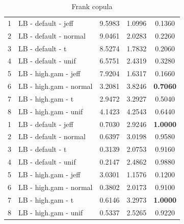 \documentclass{amsart}
\begin{document}
\begin{table}[ht]
\begin{tabular}{l|l|ccc}
   \midrule
1 & LB - default - jeff & 9.5983 & 1.0996 & 0.1360 \\ 
  2 & LB - default - normal & 9.0461 & 2.0283 & 0.2260 \\ 
  3 & LB - default - t & 8.5274 & 1.7832 & 0.2060 \\ 
  4 & LB - default - unif & 6.5751 & 2.4319 & 0.3280 \\ 
  5 & LB - high.gam - jeff & 7.9204 & 1.6317 & 0.1660 \\ 
  6 & LB - high.gam - normal & 3.2081 & 3.8246 & \textbf{0.7060} \\ 
  7 & LB - high.gam - t & 2.9472 & 3.2927 & 0.5040 \\ 
  8 & LB - high.gam - unif & 4.1423 & 4.2543 & 0.6440 \\
   \midrule
1 & LB - default - jeff & 0.7030 & 2.9246 & \textbf{1.0000} \\ 
  2 & LB - default - normal & 0.6397 & 3.0198 & 0.9580 \\ 
  3 & LB - default - t & 0.3139 & 2.0753 & 0.9160 \\ 
  4 & LB - default - unif & 0.2147 & 2.4862 & 0.9880 \\ 
  5 & LB - high.gam - jeff & 3.0301 & 1.1576 & 0.1200 \\ 
  6 & LB - high.gam - normal & 0.3802 & 2.0173 & 0.9100 \\ 
  7 & LB - high.gam - t & 0.6146 & 3.2973 & \textbf{1.0000} \\ 
  8 & LB - high.gam - unif & 0.5337 & 2.5265 & 0.9220 \\ 
   \bottomrule
\end{tabular}
\caption{Frank copula}
\end{table}
\end{document}
